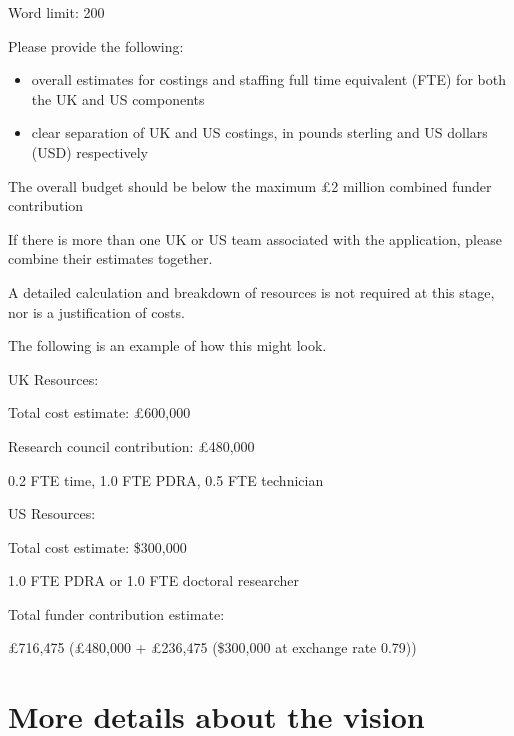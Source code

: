 \documentclass[12in]{article}
\begin{document}
{\color{red}

Word limit: 200

Please provide the following:

\begin{itemize}

	\item overall estimates for costings and staffing full time equivalent (FTE) for both
the UK and US components

	\item clear separation of UK and US costings, in pounds sterling and US dollars
(USD) respectively

\end{itemize}

The overall budget should be below the maximum £2 million combined funder
contribution

If there is more than one UK or US team associated with the application, please
combine their estimates together.

A detailed calculation and breakdown of resources is not required at this stage,
nor is a justification of costs.

The following is an example of how this might look.

UK Resources:

Total cost estimate: £600,000

Research council contribution: £480,000

0.2 FTE time, 1.0 FTE PDRA, 0.5 FTE technician

US Resources:

Total cost estimate: \$300,000

1.0 FTE PDRA or 1.0 FTE doctoral researcher

Total funder contribution estimate:

£716,475 (£480,000 + £236,475 (\$300,000 at exchange rate 0.79))

}

\appendix

\section{More details about the vision}





\end{document}

